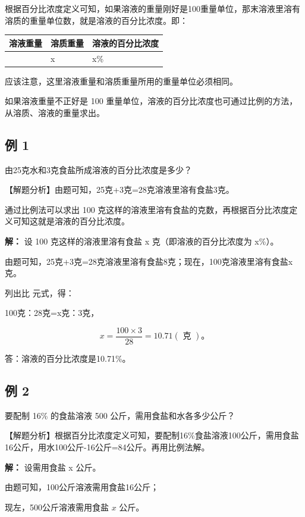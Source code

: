 根据百分比浓度定义可知，如果溶液的重量刚好是100重量单位，那末溶液里溶有溶质的重量单位数，就是溶液的百分比浓度。即：

{\def\LTcaptype{none} %
\begin{longtable}[]{@{}lll@{}}
\toprule\noalign{}
溶液重量 & 溶质重量 & 溶液的百分比浓度 \\
\midrule\noalign{}
\endhead
\bottomrule\noalign{}
\endlastfoot
100 & x & x\% \\
\end{longtable}
}

应该注意，这里溶液重量和溶质重量所用的重量单位必须相同。

如果溶液重量不正好是 100
重量单位，溶液的百分比浓度也可通过比例的方法，从溶质、溶液的重量求出。

\subsection{例 1}

由25克水和3克食盐所成溶液的百分比浓度是多少？

【解题分析】由题可知，25克+3克=28克溶液里溶有食盐3克。

通过比例法可以求出 100
克这样的溶液里溶有食盐的克数，再根据百分比浓度定义可知这就是溶液的百分比浓度。

\textbf{解：} 设 100 克这样的溶液里溶有食盐 x 克（即溶液的百分比浓度为
x\%）。

由题可知，25克+3克=28克溶液里溶有食盐8克；现在，100克溶液里溶有食盐x克。

列出比 元式，得：

100克：28克=x克：3克，

\[
x = \frac {100 \times 3}{28} = 10.71 (\text{ 克 })\text{。}
\]

答：溶液的百分比浓度是10.71\%。

\subsection{例 2}

要配制 16\% 的食盐溶液 500 公斤，需用食盐和水各多少公斤？

【解题分析】根据百分比浓度定义可知，要配制16\%食盐溶液100公斤，需用食盐16公斤，用水100公斤-16公斤=84公斤。再用比例法解。

\textbf{解：} 设需用食盐 x 公斤。

由题可知，100公斤溶液需用食盐16公斤；

现左，500公斤溶液需用食盐 \(x\) 公斤。

